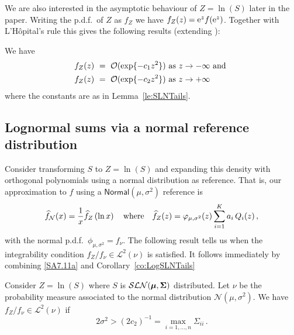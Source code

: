We are also interested in the asymptotic behaviour of $Z = \ln(S)$ later in the paper. Writing the p.d.f.\ of $Z$ as $f_Z$ we have $f_Z(z) = \mathrm{e}^{z}f(\mathrm{e}^{z})$. Together with L'H\^opital's rule this gives the following results (extending \cite{gao2009asymptotic}):

\begin{corollary} \label{co:LogSLNTails}
We have
\begin{align} \label{LogSLNLeftTail}
	f_Z(z)  \ &=\  {\mathcal{O}}(\exp \{-c_1 z^2 \} ) \text{\ as } z\to -\infty
	 \text{ and } \\
 \label{LogSLNRightTail}
	f_Z(z) \ &=\ {\mathcal{O}}(\exp\{-c_2 z^2 \}) \text{\ as } z \to +\infty
\end{align}
where the constants are as in Lemma~\ref{le:SLNTails}.
\end{corollary}

\subsection{Lognormal sums via a normal reference distribution} \label{SS:LNNormalNu}

Consider transforming $S$ to $Z=\ln(S)$ and expanding this density with orthogonal polynomials using a normal distribution as reference. That is, our approximation to $f$ using a $\mathsf{Normal}(\mu, \sigma^2)$ reference is
\[ \widehat{f}_{\mathcal{N}}(x) = \frac{1}{x} \widehat{f}_{Z}\left(\ln x \right) \quad\text{where}\quad \widehat{f}_{Z}(z) = \varphi_{\mu,\sigma^2}(z) \sum_{i=1}^K a_i \, Q_i(z) \,, \]
with  the normal p.d.f.\ $\phi_{\mu,\sigma^2}=f_\nu$. The following result tells us when the integrability condition $f_{Z}/f_\nu \in\mathcal{L}^{2}(\nu)$ is satisfied.
It follows immediately by combining \eqref{SA7.11a} and Corollary~\ref{co:LogSLNTails}

\begin{proposition}\label{eq:IntegrabilityConditionNormalHermiteExpansion}
Consider $Z=\ln(S)$ where $S$ is $\mathcal{SLN}(\boldsymbol{\mu},\bm{\Sigma})$ distributed. Let $\nu$ be the probability measure associated to the normal distribution $\mathcal{N}(\mu,\sigma^2)$. We have $f_Z / f_\nu \in\mathcal{L}^{2}(\nu)$ if
\begin{equation} \label{normal_int_cond_1}
	2 \sigma^2 > (2 c_2)^{-1} = \max_{i=1,\dots,n} \Sigma_{ii} \,.
\end{equation}
\end{proposition}


